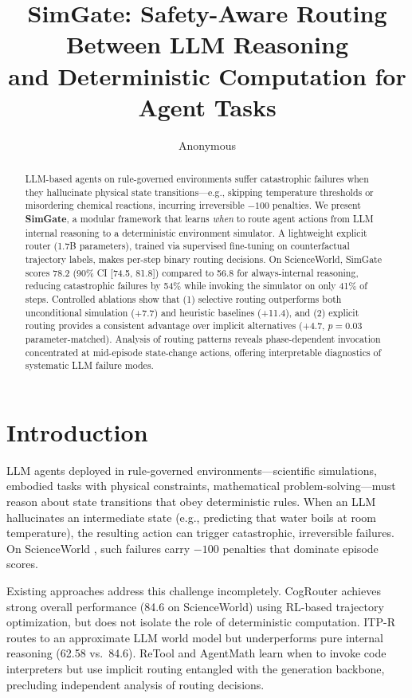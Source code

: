\documentclass[11pt,a4paper]{article}
\title{SimGate: Safety-Aware Routing Between LLM Reasoning\\and Deterministic Computation for Agent Tasks}
\author{Anonymous}
\date{}
\begin{document}
\maketitle

\begin{abstract}
LLM-based agents on rule-governed environments suffer catastrophic failures when they hallucinate physical state transitions---e.g., skipping temperature thresholds or misordering chemical reactions, incurring irreversible $-100$ penalties. We present \textbf{SimGate}, a modular framework that learns \emph{when} to route agent actions from LLM internal reasoning to a deterministic environment simulator. A lightweight explicit router (1.7B parameters), trained via supervised fine-tuning on counterfactual trajectory labels, makes per-step binary routing decisions. On ScienceWorld, SimGate scores 78.2 (90\% CI [74.5, 81.8]) compared to 56.8 for always-internal reasoning, reducing catastrophic failures by 54\% while invoking the simulator on only 41\% of steps. Controlled ablations show that (1) selective routing outperforms both unconditional simulation (+7.7) and heuristic baselines (+11.4), and (2) explicit routing provides a consistent advantage over implicit alternatives (+4.7, $p{=}0.03$ parameter-matched). Analysis of routing patterns reveals phase-dependent invocation concentrated at mid-episode state-change actions, offering interpretable diagnostics of systematic LLM failure modes.
\end{abstract}

\section{Introduction}

LLM agents deployed in rule-governed environments---scientific simulations, embodied tasks with physical constraints, mathematical problem-solving---must reason about state transitions that obey deterministic rules. When an LLM hallucinates an intermediate state (e.g., predicting that water boils at room temperature), the resulting action can trigger catastrophic, irreversible failures. On ScienceWorld \cite{wang2022scienceworld}, such failures carry $-100$ penalties that dominate episode scores.

Existing approaches address this challenge incompletely. CogRouter \cite{cogrouter2025} achieves strong overall performance (84.6 on ScienceWorld) using RL-based trajectory optimization, but does not isolate the role of deterministic computation. ITP-R \cite{itpr2024} routes to an approximate LLM world model but underperforms pure internal reasoning (62.58 vs.\ 84.6). ReTool \cite{retool2024} and AgentMath \cite{agentmath2024} learn when to invoke code interpreters but use implicit routing entangled with the generation backbone, precluding independent analysis of routing decisions.
\end{document}
